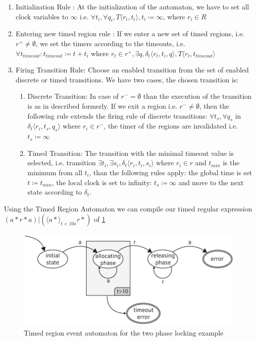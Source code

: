 				\begin{enumerate}
					\item Initialization Rule : At the initialization  of the automaton, we have to set all clock variables to $\infty$ 
					i.e. $\forall t_i, \forall q_i, T \langle r_i, t_i \rangle, t_i \coloneqq \infty $, where $r_i \in R$
				
					\item Entering new timed region rule :
					If we enter a new set of timed regions, 
					i.e. $r^+ \neq \emptyset$, 
					we set the timers according to the timeouts, 
					i.e. $\forall t_{timeout} : t_{timeout} \coloneqq t + t_i $ where $ r_t \in r^+, \exists q ,\delta_t\langle  r_t,t_i,q \rangle, T \langle r_t, t_{timeout} \rangle$
					
					\item Firing Transition Rule: Choose an enabled transition from the set of enabled discrete or timed transitions. 
					We have two cases, the chosen transition is:
						\begin{enumerate}
							\item Discrete Transition: In case of $r^- = \emptyset$ than the execution of the transition is as in described formerly. 
								If we exit a region i.e. $r^- \neq \emptyset$, 
								then the following rule extends the firing rule of discrete transitions:
								$\forall t_s, \forall q_s$ in $ \delta_t \langle r_i, t_s, q_s \rangle$ where $r_i \in r^-$, the timer of the regions are invalidated i.e.
								$t_s \coloneqq \infty$
							\item Timed Transition: The transition with the minimal timeout value is selected, 
								 i.e. transition $\exists t_i, \exists s_i, \delta_t \langle r_i, t_i, s_i \rangle$ where $ r_i \in r$ and $t_{min}$ is the minimum from all $t_i$,
								 than the following rules apply:
								 the global time is set $t \coloneqq t_{min}$, 
								 the local clock is set to infinity: $t_s \coloneqq \infty$ 
								 and move to the next state according to $\delta_t$.
						\end{enumerate}			
				\end{enumerate}
				
				Using the Timed Region Automaton we can compile our timed regular expression $(a\ast r\ast a)|( \langle a \ast \rangle_{t < 10 s} r \ast)$ of \cref{fig:cep:trea}
				
				\begin{figure}[h]
				\centering
				\includegraphics[width=0.7\linewidth]{include/figures/chapter_5/illustration_2}
				\caption{Timed region event automaton for the two phase locking example}
				\label{fig:cep:trea}
				\end{figure}


